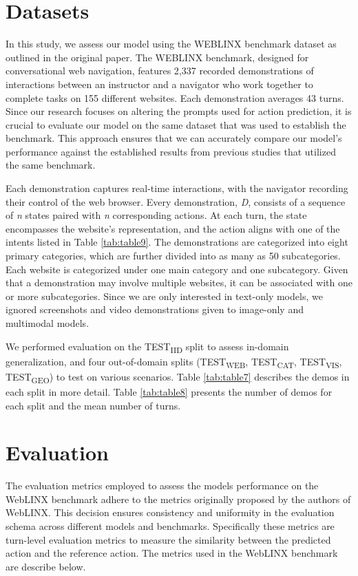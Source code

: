 \documentclass[11pt]{article}
\begin{document}
\section{Datasets} \label{sec:dataset}
In this study, we assess our model using the WEBLINX benchmark dataset as outlined in the original paper. The WEBLINX benchmark, designed for conversational web navigation, features 2,337 recorded demonstrations of interactions between an instructor and a navigator who work together to complete tasks on 155 different websites. Each demonstration averages 43 turns. Since our research focuses on altering the prompts used for action prediction, it is crucial to evaluate our model on the same dataset that was used to establish the benchmark. This approach ensures that we can accurately compare our model's performance against the established results from previous studies that utilized the same benchmark.

Each demonstration captures real-time interactions, with the navigator recording their control of the web browser. Every demonstration, \textit{D}, consists of a sequence of \textit{n} states paired with \textit{n} corresponding actions. At each turn, the state encompasses the website's representation, and the action aligns with one of the intents listed in Table \ref{tab:table9}. The demonstrations are categorized into eight primary categories, which are further divided into as many as 50 subcategories. Each website is categorized under one main category and one subcategory. Given that a demonstration may involve multiple websites, it can be associated with one or more subcategories. Since we are only interested in text-only models, we ignored screenshots and video demonstrations given to image-only and multimodal models. 

We performed evaluation on the TEST\textsubscript{IID} split to assess in-domain generalization, and four out-of-domain splits (TEST\textsubscript{WEB}, TEST\textsubscript{CAT}, TEST\textsubscript{VIS}, TEST\textsubscript{GEO}) to test on various scenarios. Table \ref{tab:table7} describes the demos in each split in more detail. Table \ref{tab:table8} presents the number of demos for each split and the mean number of turns. 

\section{Evaluation}

The evaluation metrics employed to assess the models performance on the WebLINX benchmark adhere to the metrics originally proposed by the authors of WebLINX. This decision ensures consistency and uniformity in the evaluation schema across different models and benchmarks. Specifically these metrics are turn-level evaluation metrics to measure the similarity between the predicted action and the reference action. The metrics used in the WebLINX benchmark are describe below.
 
\end{document}

